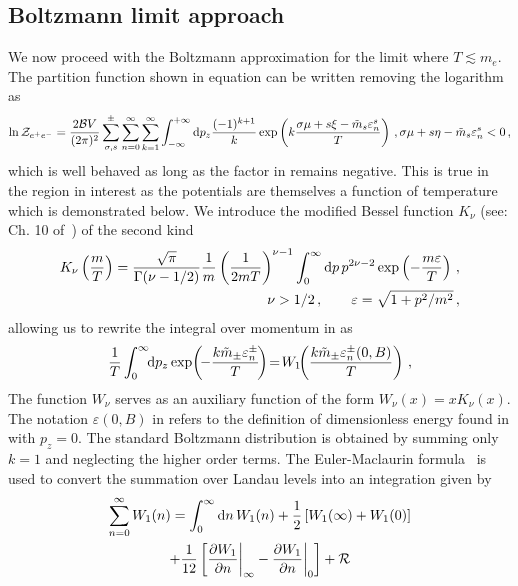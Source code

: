 \subsection{Boltzmann limit approach}
\label{sec:boltzmann}
\noindent We now proceed with the Boltzmann approximation for the limit where $T\lesssim m_e$. The partition function shown in equation  can be written removing the logarithm as
\begin{align}
 \label{partitionpower}
 \ln{{\cal Z}_{e^{+}e^{-}}}=\frac{2{\cal B}V}{(2\pi)^{2}}\sum_{\sigma,s}^{\pm}\sum_{n=0}^{\infty}\sum_{k=1}^{\infty}\int_{-\infty}^{+\infty}{\rm d}p_{z}
 \frac{(-1)^{k+1}}{k}\exp\left({k\frac{\sigma\mu+s\xi-{\tilde m}_{s}\varepsilon^{s}_{n}}{T}}\right)\,,
 \label{bapprox} 
 \sigma\mu+s\eta-{\tilde m}_{s}\varepsilon_{n}^{s}<0\,,
\end{align}
which is well behaved as long as the factor in  remains negative. This is true in the region in interest as the potentials are themselves a function of temperature which is demonstrated below. We introduce {\color{blue}the modified Bessel function $K_{\nu}$} (see: Ch. 10 of~\cite{Letessier:2002ony}) of the second kind
\begin{align}
 \label{besselk}
 K_{\nu}\left(\frac{m}{T}\right)=\frac{\sqrt{\pi}}{\Gamma(\nu-1/2)}\frac{1}{m}\left(\frac{1}{2mT}\right)^{\nu-1}
 \int_{0}^{\infty}{\rm d}p\,p^{2\nu-2}\exp\left({-\frac{m\varepsilon}{T}}\right)\,,\\
 \nu>1/2\,,\qquad\varepsilon=\sqrt{1+p^{2}/m^{2}}\,,
\end{align}
allowing us to rewrite the integral over momentum in  as
\begin{align}
 \label{besselkint}
 \frac{1}{T}\int_{0}^{\infty}\!\!{\rm d}p_{z}\exp\!\left(\!{-\frac{k{\tilde m}_{\pm}\varepsilon_{n}^{\pm}}{T}}\!\right)\!=\!W_{1}\!\!\left(\frac{k{\tilde m}_{\pm}\varepsilon_{n}^{\pm}(0,B)}{T}\right)\,,
\end{align}
The function $W_{\nu}$ serves as an auxiliary function of the form $W_{\nu}(x)=xK_{\nu}(x)$. The notation $\varepsilon(0,B)$ in  refers to the definition of dimensionless energy found in  with $p_{z}=0$. The standard Boltzmann distribution is obtained by summing only $k=1$ and neglecting the higher order terms. The Euler-Maclaurin formula~\cite{abramowitz1988handbook} is used to convert the summation over Landau levels into an integration given by
\begin{multline}
 \label{eulermaclaurin}
 \sum_{n=0}^{\infty}W_{1}(n)=\int_{0}^{\infty}{\rm d}n\,W_{1}(n)+\frac{1}{2}\left[W_{1}(\infty)+W_{1}(0)\right]\\
 +\frac{1}{12}\left[\frac{\partial W_{1}}{\partial n}\bigg\vert_{\infty}-\frac{\partial W_{1}}{\partial n}\bigg\vert_{0}\right]+{\cal R}
\end{multline}
